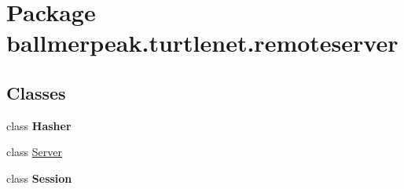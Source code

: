 \hypertarget{namespaceballmerpeak_1_1turtlenet_1_1remoteserver}{\section{Package ballmerpeak.\-turtlenet.\-remoteserver}
\label{namespaceballmerpeak_1_1turtlenet_1_1remoteserver}
}
\subsection*{Classes}
\begin{DoxyCompactItemize}
\item 
class {\bfseries Hasher}
\item 
class \hyperlink{classballmerpeak_1_1turtlenet_1_1remoteserver_1_1Server}{Server}
\item 
class {\bfseries Session}
\end{DoxyCompactItemize}
